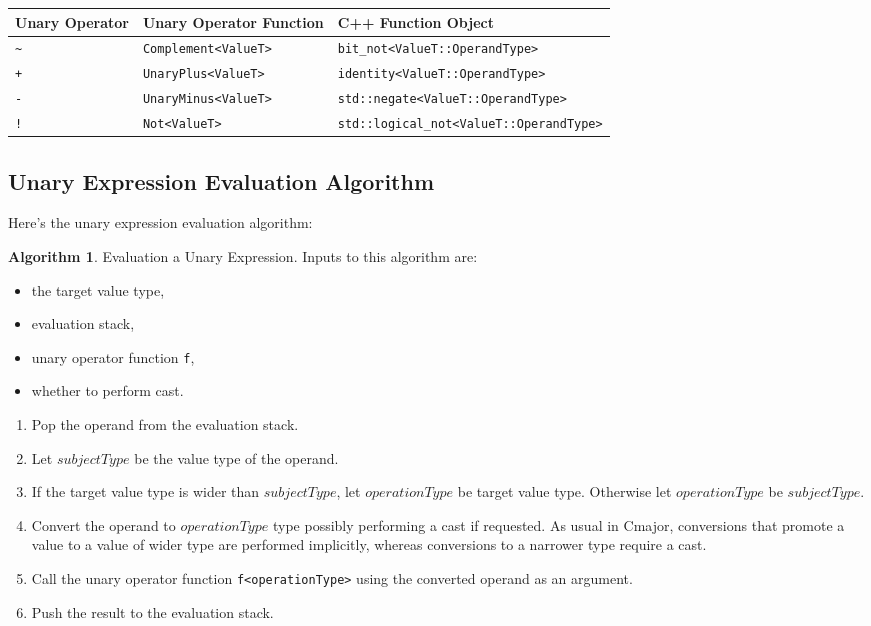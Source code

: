 \documentclass[a4paper,oneside,11pt]{book}
\theoremstyle{definition}
\newtheorem{algo}{Algorithm}[section]
\begin{document}
\begin{flushleft}
\begin{supertabular}{lll}
\textbf{Unary Operator}& \textbf{Unary Operator Function}& \textbf{C++ Function Object}\\
\hline
\verb|~|& \verb|Complement<ValueT>|& \verb|bit_not<ValueT::OperandType>|\\
\verb|+|& \verb|UnaryPlus<ValueT>|& \verb|identity<ValueT::OperandType>|\\
\verb|-|& \verb|UnaryMinus<ValueT>|& \verb|std::negate<ValueT::OperandType>|\\
\verb|!|& \verb|Not<ValueT>|& \verb|std::logical_not<ValueT::OperandType>|\\
\hline
\end{supertabular}
\end{flushleft}

\clearpage
\subsection{Unary Expression Evaluation Algorithm}

Here's the unary expression evaluation algorithm:

\begin{algo}\label{unaryexpreval} Evaluation a Unary Expression.
Inputs to this algorithm are:
\begin{itemize}
\item
the target value type,
\item
evaluation stack,
\item
unary operator function \verb|f|,
\item
whether to perform cast.
\end{itemize}

\begin{enumerate}
\item
Pop the operand from the evaluation stack.
\item
Let $subjectType$ be the value type of the operand.
\item
If the target value type is wider than $subjectType$, let $operationType$ be target value type.
Otherwise let $operationType$ be $subjectType$.
\item
Convert the operand to $operationType$ type possibly performing a cast if requested.
As usual in Cmajor, conversions that promote a value to a value of wider type are performed implicitly,
whereas conversions to a narrower type require a cast.
\item
Call the unary operator function \verb|f<operationType>| using the converted operand as an argument.
\item
Push the result to the evaluation stack.
\end{enumerate}
\end{algo}
\end{document}
